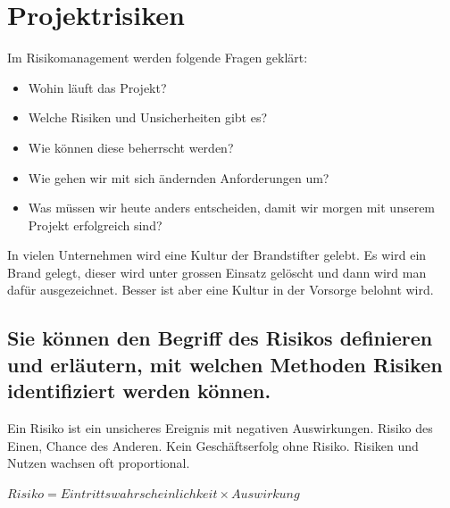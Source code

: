 \chapter{Projektrisiken}
Im Risikomanagement werden folgende Fragen geklärt:

\begin{itemize}
	\item Wohin läuft das Projekt?
	\item Welche Risiken und Unsicherheiten gibt es?
	\item Wie können diese beherrscht werden?
	\item Wie gehen wir mit sich ändernden Anforderungen um?
	\item Was müssen wir heute anders entscheiden, damit wir morgen mit unserem Projekt erfolgreich sind?
\end{itemize}

In vielen Unternehmen wird eine Kultur der Brandstifter gelebt. Es wird ein Brand gelegt, dieser wird unter grossen Einsatz gelöscht und dann wird man dafür ausgezeichnet. Besser ist aber eine Kultur in der Vorsorge belohnt wird.

\section{Sie können den Begriff des Risikos definieren und erläutern, mit welchen Methoden Risiken identifiziert werden können.}
\label{sec:risikomanagement-definition-risiko}

Ein Risiko ist ein unsicheres Ereignis mit negativen Auswirkungen. Risiko des Einen, Chance des Anderen. Kein Geschäftserfolg ohne Risiko. Risiken und Nutzen wachsen oft proportional.

\begin{center}
	\begin{math}
		Risiko = Eintrittswahrscheinlichkeit \times Auswirkung
	\end{math}
\end{center}

